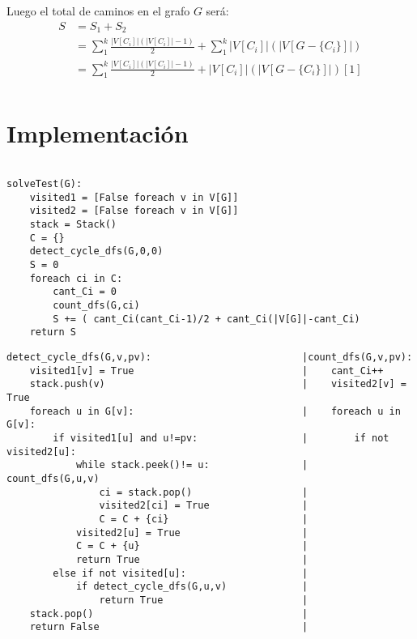 \documentclass[12pt]{article}
\begin{document}
Luego el total de caminos en el grafo $G$ ser\'a:\\

\begin{equation}
\begin{split}
S &= S_1 + S_2\\
  &= \sum\limits_{1}^{k} \frac{|V[C_i]|(|V[C_i]|-1)}{2} + \sum\limits_{1}^{k} |V[C_i]|(| V[G-\{C_i\}] |)\\
  &= \sum\limits_{1}^{k} \frac{|V[C_i]|(|V[C_i]|-1)}{2} + |V[C_i]|(| V[G-\{C_i\}] |)              [1]\\
\end{split}
\end{equation}



\section{Implementación}

\begin{verbatim}

solveTest(G):
    visited1 = [False foreach v in V[G]]
    visited2 = [False foreach v in V[G]]
    stack = Stack()
    C = {}
    detect_cycle_dfs(G,0,0)
    S = 0
    foreach ci in C:
        cant_Ci = 0
        count_dfs(G,ci)
        S += ( cant_Ci(cant_Ci-1)/2 + cant_Ci(|V[G]|-cant_Ci) 
    return S

\end{verbatim}

\begin{verbatim}     
detect_cycle_dfs(G,v,pv):                          |count_dfs(G,v,pv):
    visited1[v] = True                             |    cant_Ci++                         
    stack.push(v)                                  |    visited2[v] = True
    foreach u in G[v]:                             |    foreach u in G[v]:
        if visited1[u] and u!=pv:                  |        if not visited2[u]:
            while stack.peek()!= u:                |            count_dfs(G,u,v)
                ci = stack.pop()                   |
                visited2[ci] = True                |
                C = C + {ci}                       |
            visited2[u] = True                     |
            C = C + {u}                            |
            return True                            |
        else if not visited[u]:                    |
            if detect_cycle_dfs(G,u,v)             |
                return True                        |
    stack.pop()                                    |
    return False                                   |
                                                   
\end{verbatim}
\end{document}
